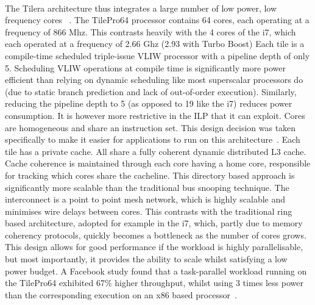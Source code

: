 \paragraph{} The Tilera architecture thus integrates a large number of low power, 
low frequency cores ~\cite{wentzlaff2007tile}. The TilePro64 processor contains 
64 cores, each operating at a frequency of 866 Mhz. This contrasts heavily
with the 4 cores of the i7, which each operated at a frequency of 2.66 Ghz (2.93 with
Turbo Boost)  Each tile is a compile-time scheduled triple-issue VLIW processor with 
a pipeline depth of only 5. Scheduling VLIW operations at compile time is 
significantly more power efficient
than relying on dynamic scheduling like most superscalar processors do (due to
static branch prediction and lack of out-of-order execution). Similarly,
reducing the pipeline depth to 5 (as opposed to 19 like the i7) reduces
power consumption. 
It is however more restrictive in the ILP that it can exploit. Cores are homogeneous and share 
an instruction set. This design decision was taken specifically to make it 
easier for applications to run on this architecture~\cite{wentzlaff2007tile}. Each
tile has a private cache. All share a fully coherent dynamic
distributed L3 cache.  Cache coherence is maintained
through each core having a home core, responsible for tracking
which cores share the cacheline. This directory based approach is significantly
more scalable than the traditional bus snooping technique.  The interconnect is a point to point mesh network, which
is highly scalable and minimises wire delays between cores. This
contrasts with the traditional ring based architecture, adopted for example
in the i7,  which, partly due to memory coherency protocols, quickly becomes a bottleneck
as the number of cores grows. This design allows for good performance
if the workload is highly parallelisable, but most
importantly, it provides the ability to scale whilst satisfying a low power budget. 
A Facebook study found that a task-parallel workload running on the TilePro64 exhibited
67\% higher throughput, whilst using 3 times less power than the corresponding
execution on an x86 based processor~\cite{berezecki2011manycore}. 

